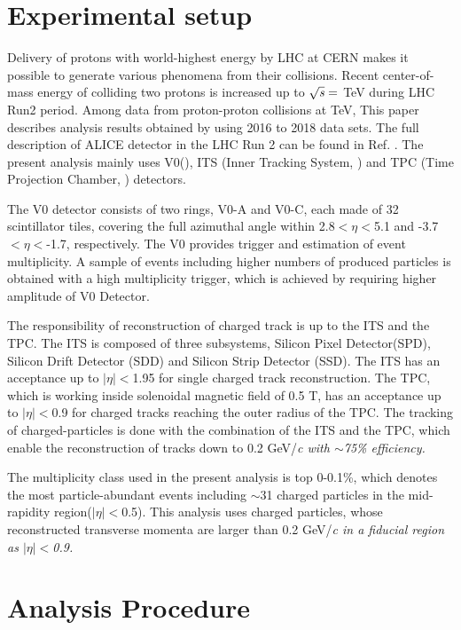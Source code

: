 
\section{Experimental setup}
\label{sec:experiment}

Delivery of protons with world-highest energy by LHC at CERN makes it possible to generate various phenomena from their collisions. Recent center-of-mass energy of colliding two protons is increased up to $\sqrt{\it{s}} =$ \unit[13]{TeV} during LHC Run2 period. Among data from proton-proton collisions at \unit[13]{TeV}, This paper describes analysis results obtained by using 2016 to 2018 data sets. The full description of ALICE detector in the LHC Run 2 can be found in Ref. \cite{ALICEdet}. The present analysis mainly uses V0(\cite{VZEROpaper}), ITS (Inner Tracking System, \cite{ITSpaper}) and TPC (Time Projection Chamber, \cite{TPCpaper}) detectors.

The V0 detector consists of two rings, V0-A and V0-C, each made of 32 scintillator tiles, covering the full azimuthal angle within 2.8$<\eta<$5.1 and -3.7$<\eta<$-1.7, respectively. The V0 provides trigger and estimation of event multiplicity. A sample of events including higher numbers of produced particles is obtained with a high multiplicity trigger, which is achieved by requiring higher amplitude of V0 Detector. 

The responsibility of reconstruction of charged track is up to the ITS and the TPC. The ITS is composed of three subsystems, Silicon Pixel Detector(SPD), Silicon Drift Detector (SDD) and Silicon Strip Detector (SSD). The ITS has an acceptance up to $|\eta|<$1.95 for single charged track reconstruction. The TPC, which is working inside solenoidal magnetic field of 0.5 T, has an acceptance up to $|\eta|<$0.9 for charged tracks reaching the outer radius of the TPC. The tracking of charged-particles is done with the combination of the ITS and the TPC, which enable the reconstruction of tracks down to 0.2 GeV/\it{c}\rm{} with $\sim$75\% efficiency.

The multiplicity class used in the present analysis is top 0-0.1\%, which denotes the most particle-abundant events including  $\sim$31 charged particles in the mid-rapidity region($|\eta|<$0.5). This analysis uses charged particles, whose reconstructed transverse momenta are larger than 0.2 GeV/\it{c}\rm{} in a fiducial region as $|\eta|<$0.9. 

\section{Analysis Procedure}
\label{sec:na}

